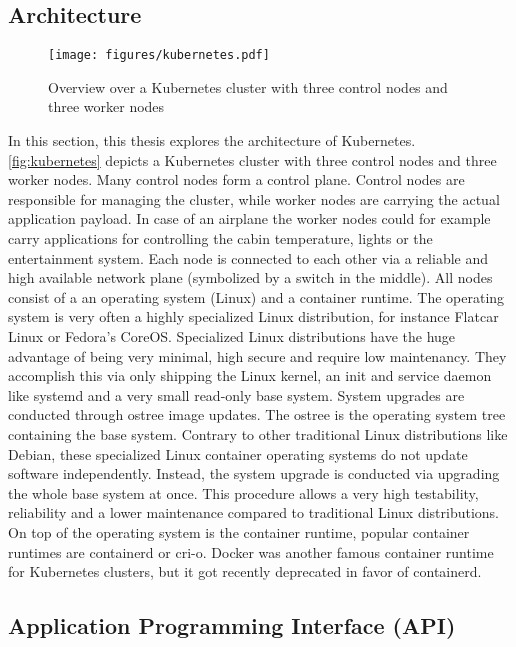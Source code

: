 \documentclass[titlepage]{report}
\begin{document}
\subsection{Architecture}
\begin{figure}[H]
    \centering
    \texttt{[image: figures/kubernetes.pdf]}
    \caption{Overview over a Kubernetes cluster with three control nodes and three worker nodes}\label{fig:kubernetes}
\end{figure}
In this section, this thesis explores the architecture of Kubernetes. \autoref{fig:kubernetes} depicts a Kubernetes cluster with three control nodes and three worker nodes. Many control nodes form a control plane.
Control nodes are responsible for managing the cluster, while worker nodes are carrying the actual application payload. In case of an airplane the worker nodes could for example carry applications for controlling
the cabin temperature, lights or the entertainment system. Each node is connected to each other via a reliable and high available network plane (symbolized by a switch in the middle). All nodes consist of a
an operating system (Linux) and a container runtime. The operating system is very often a highly specialized Linux distribution, for instance Flatcar Linux\cite{FlatcarLinux} or Fedora's CoreOS\cite{FedoraCoreOS}.
Specialized Linux distributions have the huge advantage of being very minimal, high secure and require low maintenancy. They accomplish this via only shipping the Linux kernel, an init and service daemon like systemd\cite{systemd}
and a very small read-only base system. System upgrades are conducted through ostree image updates. The ostree is the operating system tree containing the base system. Contrary to other traditional Linux distributions like Debian,
these specialized Linux container operating systems do not update software independently. Instead, the system upgrade is conducted via upgrading the whole base system at once. This procedure allows a very high testability, reliability
and a lower maintenance compared to traditional Linux distributions. On top of the operating system is the container runtime, popular container runtimes are containerd\cite{Containerd} or cri-o\cite{CRIO}. Docker was another famous
container runtime for Kubernetes clusters, but it got recently deprecated in favor of containerd\cite{KubernetesDockerNews}.

\subsection{Application Programming Interface (API)}
\end{document}
